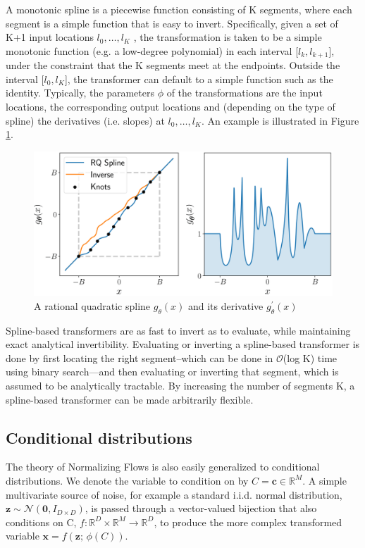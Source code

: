 A monotonic spline is a piecewise function consisting of K segments, where each segment is a simple function that is easy to invert. Specifically, given a set of K+1 input locations $l_{0}, \dots, l_K$ , the transformation
is taken to be a simple monotonic function (e.g. a low-degree polynomial) in each interval
[$l_{k}, l_{k+1}$], under the constraint that the K segments meet at the endpoints.
Outside the interval [$l_{0}, l_K$], the transformer can default to a simple function such as the
identity. Typically, the parameters $\phi$ of the transformations are the input locations, 
the corresponding output locations and (depending on the type of spline) the
derivatives (i.e. slopes) at $l_{0}, \dots, l_K$. An example is illustrated in Figure \ref{fig:rqs}.

\begin{figure}
    \centering
    \includegraphics[width=\columnwidth]{gfx/ch3/D9F0PDyWsAAWKHf.png}
    \caption[Rational quadratic spline]{A rational quadratic spline $g_{\theta}(x)$ and its derivative $g_{\theta}^{'}(x)$}
    \label{fig:rqs}
\end{figure}

Spline-based transformers are as fast to invert as to evaluate, while
maintaining exact analytical invertibility. Evaluating or inverting a spline-based transformer
is done by first locating the right segment--which can be done in $\mathcal{O}$(log K) time using binary
search—and then evaluating or inverting that segment, which is assumed to be analytically
tractable. By increasing the number of segments K, a spline-based transformer can be
made arbitrarily flexible.

\subsection{Conditional distributions}

The theory of Normalizing Flows is also easily generalized to conditional distributions. We denote the variable to condition on by $C=\mathbf{c}\in\mathbb{R}^M$. A simple multivariate source of noise, for example a standard i.i.d. normal distribution, $\mathbf{z}\sim\mathcal{N}(\mathbf{0},I_{D\times D})$, is passed through a vector-valued bijection that also conditions on C, $f:\mathbb{R}^D\times\mathbb{R}^M\rightarrow\mathbb{R}^D$, to produce the more complex transformed variable $\mathbf{x}=f(\mathbf{z};\, \phi(C))$. 

